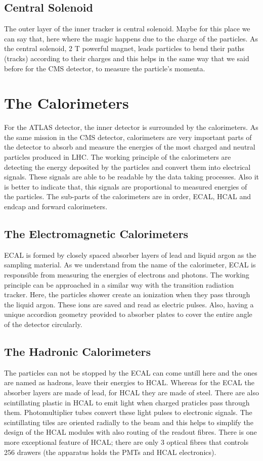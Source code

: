 \documentclass[a4paper,9pt]{article}
\begin{document}
\subsection{Central Solenoid}
The outer layer of the inner tracker is central solenoid. Maybe for this place we can say that, here where the magic happens due to the
charge of the particles. As the central solenoid, 2 T powerful magnet, leads particles to bend their paths (tracks) according to their
charges and this helps in the same way that we said before for the CMS detector, to measure the particle's momenta.

\section{The Calorimeters}

For the ATLAS detector, the inner detector is surrounded by the calorimeters.
As the same mission in the CMS detector, calorimeters are very important
parts of the detector to absorb and measure the energies of the most
charged and neutral particles produced in LHC. The working principle 
of the calorimeters are detecting the energy deposited by the particles 
and convert them into electrical signals. These signals are able to be readable
by the data taking processes. Also it is better to indicate that, this
signals are proportional to measured energies of the particles.
The sub-parts of the calorimeters are in order, ECAL, HCAL and
endcap and forward calorimeters.

\subsection{The Electromagnetic Calorimeters}
ECAL is formed by closely spaced absorber layers of lead and liquid 
argon as the sampling material. As we understand from the name of the
calorimeter, ECAL is responsible from measuring the energies of electrons
and photons. The working principle can be approached in a similar
way with the transition radiation tracker. Here, the particles shower create
an ionization when they pass through the liquid argon. These ions are saved and read as
electric pulses. Also, having a unique accordion geometry provided to
absorber plates to cover the entire angle of the detector circularly.

\subsection{The Hadronic Calorimeters}
The particles can not be stopped by the ECAL can come untill here and
the ones are named as hadrons, leave their energies to HCAL.
Whereas for the ECAL the absorber layers are made of lead, for HCAL they are
made of steel. There are also scintillating plastic in HCAL to emit light when
charged praticles pass through them. Photomultiplier tubes convert these
light pulses to electronic signals. The scintillating tiles are oriented
radially to the beam and this helps to simplify the design of the HCAL
modules with also routing of the readout fibres. There is one more exceptional
feature of HCAL; there are only 3 optical fibres that controls 256 drawers
(the apparatus holds the PMTs and HCAL electronics).
\end{document}
